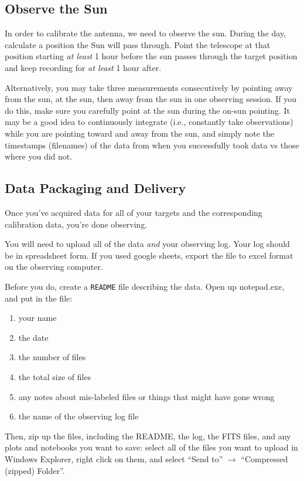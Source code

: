 \documentclass[11pt]{article}
\begin{document}
\subsection{Observe the Sun}
In order to calibrate the antenna, we need to observe the sun.  During the day,
calculate a position the Sun will pass through.  Point the telescope at that
position starting \emph{at least} 1 hour before the sun passes through the
target position and keep recording for \emph{at least} 1 hour after.


Alternatively, you may take three measurements consecutively by pointing away
from the sun, at the sun, then away from the sun in one observing session.  If
you do this, make sure you carefully point at the sun during the on-sun
pointing.  It may be a good idea to continuously integrate (i.e., constantly
take observations) while you are pointing toward and away from the sun, and
simply note the timestamps (filenames) of the data from when you successfully
took data vs those where you did not.


\subsection{Data Packaging and Delivery}
Once you've acquired data for all of your targets and the corresponding calibration data, you're done observing.

You will need to upload all of the data \emph{and} your observing log.
Your log should be in spreadsheet form.  If you used
google sheets, export the file to excel format on the observing computer.

Before you do, create a \texttt{README} file describing the data.  Open up notepad.exe,
and put in the file:
\begin{enumerate}
    \item your name
    \item the date
    \item the number of files
    \item the total size of files
    \item any notes about mis-labeled files or things that might have gone wrong
    \item the name of the observing log file
\end{enumerate}

Then, zip up the files, including the README, the log, the FITS files, and any plots
and notebooks you want to save:
select all of the files you want to upload in Windows Explorer, right click on
them, and select ``Send to'' $\rightarrow$ ``Compressed (zipped) Folder''.
\end{document}
